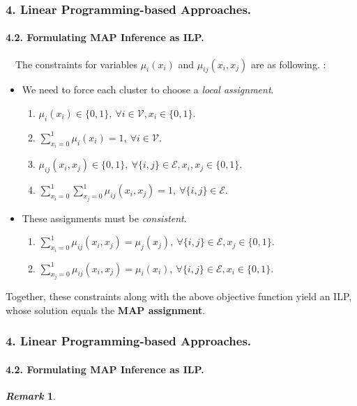 \documentclass[11pt]{beamer}
\newtheorem*{pf of lemma}{\it Proof of the \normalfont \bf Lemma}
\newtheorem*{pf of claim}{\it Proof of the \normalfont \sf Claim}
\newtheorem*{remark}{\it Remark}
\begin{document}
\begin{frame}
\frametitle{4. Linear Programming-based Approaches.}
\framesubtitle{4.2. Formulating MAP Inference as ILP.}

\ \ \indent The constraints for variables $\mu_{i}(x_i)$ and $\mu_{ij}(x_i, x_j)$ are as following. : 
\begin{itemize}
\item We need to force each cluster to choose a \textit{local assignment}. 
\begin{enumerate}
\item $\mu_i(x_i) \in \{0, 1\},\ \forall i \in \mathcal{V}, x_i \in \{0,1\}$. \\
\item $\sum_{x_i = 0}^{1} \mu_i(x_i) = 1,\ \forall i \in \mathcal{V}$. \\
\item $\mu_{ij}(x_i, x_j) \in \{0,1\},\ \forall \{i, j\} \in \mathcal{E}, x_i, x_j \in \{0,1\}$. \\
\item $\sum_{x_i = 0}^{1} \sum_{x_j = 0}^{1} \mu_{ij}(x_i, x_j) = 1,\ \forall \{i,j\} \in \mathcal{E}$.
\end{enumerate}
\item These assignments must be \textit{consistent}.
\begin{enumerate}
\item $\sum_{x_i = 0}^{1} \mu_{ij}(x_i, x_j) = \mu_j(x_j),\ \forall \{i,j\} \in \mathcal{E}, x_j \in \{0,1\}$. \\
\item $\sum_{x_j = 0}^{1} \mu_{ij}(x_i, x_j) = \mu_i(x_i),\ \forall \{i,j\} \in \mathcal{E}, x_i \in \{0,1\}$.
\end{enumerate}
\end{itemize}
Together, these constraints along with the above objective function yield an ILP, whose solution equals the \textbf{MAP assignment}.
\end{frame}

\begin{frame}
\frametitle{4. Linear Programming-based Approaches.}
\framesubtitle{4.2. Formulating MAP Inference as ILP.}

\begin{remark} 
\end{remark}

\end{frame}
\end{document}
